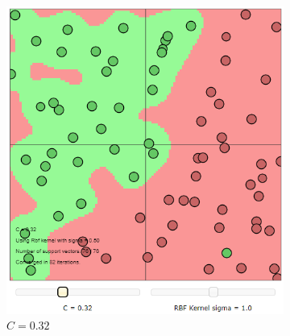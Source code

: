 \documentclass{article}
\begin{document}
        \begin{figure}[h]
             \centering
             \hspace{0.15\textwidth}
             \begin{subfigure}[b]{0.3\textwidth}
                 \centering
                 \includegraphics[width=\textwidth]{Assignment 1/figures/RBF_low_regularisation.png}
                 \caption{$C = 0.32$}
                 \label{fig:rbf_low_regularisation}
             \end{subfigure}
             \hfill
             \begin{subfigure}[b]{0.3\textwidth}
                 \centering

\end{subfigure}
\end{figure}
\end{document}
